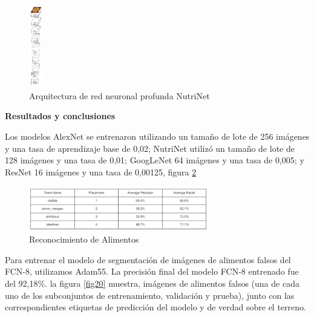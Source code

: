 \begin{figure}[h]
		\begin{center}
			\includegraphics[width=0.05\textwidth]{2/imagen2/20FIGURA20PAPER4.JPG}
	        \caption{ Arquitectura de red neuronal profunda NutriNet}
			\label{fig18}
		\end{center}
		
	\end{figure}
 
\textbf{Resultados y conclusiones}

\thinspace
Los modelos AlexNet se entrenaron utilizando un tamaño de lote de 256 imágenes y una tasa de aprendizaje base de 0,02; NutriNet utilizó un tamaño de lote de 128 imágenes y una tasa de 0,01; GoogLeNet 64 imágenes y una tasa de 0,005; y ResNet 16 imágenes y una tasa de 0,00125, figura \ref{fig19}

\begin{figure}[h]
		\begin{center}
			\includegraphics[width=0.7\textwidth]{2/imagen2/21FIGURA21PAPER4.JPG}
	        \caption{Reconocimiento de Alimentos}
			\label{fig19}
		\end{center}
		
	\end{figure}

Para entrenar el modelo de segmentación de imágenes de alimentos falsos del FCN-8, utilizamos Adam55. La precisión final del modelo FCN-8 entrenado fue del 92,18\%. la figura \ref{fig20} muestra, imágenes de alimentos falsos (una de cada uno de los subconjuntos de entrenamiento, validación y prueba), junto con las correspondientes etiquetas de predicción del modelo y de verdad sobre el terreno.

